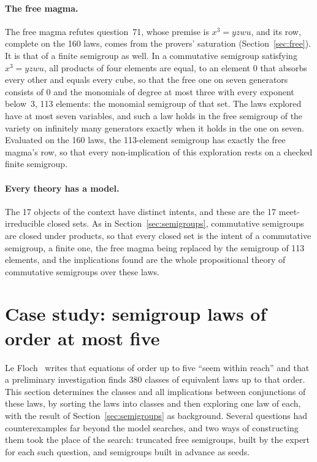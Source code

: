 \documentclass[11pt,a4paper]{article}
\theoremstyle{definition}
\theoremstyle{remark}
\begin{document}
\paragraph{The free magma.} The free magma refutes question~71, whose premise is $x^3 = yzwu$, and its row, complete on the 160 laws, comes from the provers' saturation (Section~\ref{sec:free}). It is that of a finite semigroup as well. In a commutative semigroup satisfying $x^3 = yzwu$, all products of four elements are equal, to an element $0$ that absorbs every other and equals every cube, so that the free one on seven generators consists of $0$ and the monomials of degree at most three with every exponent below~$3$, 113 elements: the monomial semigroup of that set. The laws explored have at most seven variables, and such a law holds in the free semigroup of the variety on infinitely many generators exactly when it holds in the one on seven. Evaluated on the 160 laws, the 113-element semigroup has exactly the free magma's row, so that every non-implication of this exploration rests on a checked finite semigroup.

\paragraph{Every theory has a model.} The 17 objects of the context have distinct intents, and these are the 17 meet-irreducible closed sets. As in Section~\ref{sec:semigroups}, commutative semigroups are closed under products, so that every closed set is the intent of a commutative semigroup, a finite one, the free magma being replaced by the semigroup of 113 elements, and the implications found are the whole propositional theory of commutative semigroups over these laws.

\section{Case study: semigroup laws of order at most five}\label{sec:semigroups5}

Le Floch~\cite[Section~1]{LF26b} writes that equations of order up to five ``seem within reach'' and that a preliminary investigation finds 380 classes of equivalent laws up to that order. This section determines the classes and all implications between conjunctions of these laws, by sorting the laws into classes and then exploring one law of each, with the result of Section~\ref{sec:semigroups} as background. Several questions had counterexamples far beyond the model searches, and two ways of constructing them took the place of the search: truncated free semigroups, built by the expert for each such question, and semigroups built in advance as seeds.
\end{document}
